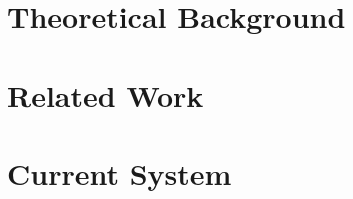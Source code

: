 
\chapter{Theoretical Background}
\label{chap:theor}



\chapter{Related Work}
\label{chap:relat}



\chapter{Current System}
\label{chap:current}


